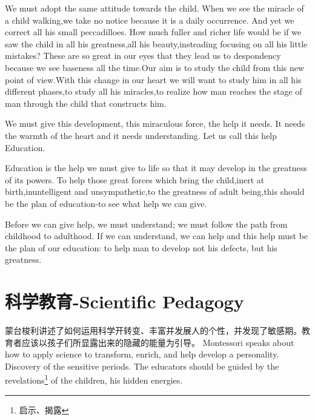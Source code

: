 \documentclass[lang=cn,10pt]{elegantbook}
\begin{document}
We must adopt the same attitude towards the child. When we see the miracle of a child walking,we take no notice because it is a daily occurrence. And yet we correct all his small peccadilloes. How much fuller and richer life would be if we saw the child in all his greatness,all his beauty,insteading focusing on all his little mistakes? These are so great in our eyes that they lead us to despondency because we see baseness all the time.Our aim is to study the child from this new point of view.With this change in our heart we will want to study him in all his different phases,to study all his miracles,to realize how man reaches the stage of man through the child that constructs him.

We must give this development, this miraculous force, the help it needs. It needs the warmth of the heart and it needs understanding. Let us call this help Education.

Education is the help we must give to life so that it may develop in the greatness of its powers. To help those great forces which bring the child,inert at birth,inuntelligent and unsympathetic,to the greatness of adult being,this should be the plan of education-to see what help we can give.

Before we can give help, we must understand; we must follow the path from childhood to adulthood. If we can understand, we can help and this help must be the plan of our education: to help man to develop not his defects, but his greatness.

\chapter{科学教育-Scientific Pedagogy}

\begin{tcolorbox}[title=摘要,
colback=red!5!white,
colframe=red!75!black,
fonttitle=\bfseries]
蒙台梭利讲述了如何运用科学开转变、丰富并发展人的个性，并发现了敏感期。教育者应该以孩子们所显露出来的隐藏的能量为引导。
Montessori speaks about how to apply science to transform, enrich, and help develop a personality. Discovery of the sensitive periods. The educators should be guided by the revelations\footnote{启示、揭露} of the children, his hidden energies.
\end{tcolorbox}
\end{document}
